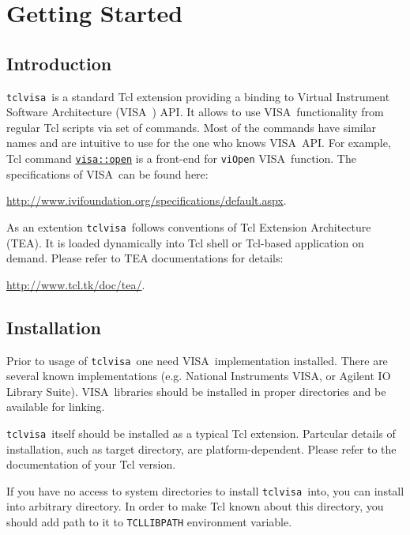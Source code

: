 \documentclass[12pt, a4paper]{report}
\newcommand{\tclvisa}{{\tt tclvisa }}
\newcommand{\VISA}{\mbox{VISA }}
\newcommand{\COMMANDREF}[1]{{\tt \hyperref[#1]{#1}}}
\newcommand{\VISACOMMANDREF}[1]{{\tt \mbox{#1}}\index{#1}}
\begin{document}
\maketitle

\tableofcontents

\chapter{Getting Started}

\section{Introduction}

\tclvisa is a standard Tcl extension providing a binding to Virtual Instrument Software Architecture (\VISA) API. It allows to use \VISA functionality from regular Tcl scripts via set of commands. Most of the commands have similar names and are intuitive to use for the one who knows \VISA API. For example, Tcl command \COMMANDREF{visa::open} is a front-end for \VISACOMMANDREF{viOpen} \VISA function. The specifications of \VISA can be found here: 

\href{http://www.ivifoundation.org/specifications/default.aspx}{http://www.ivifoundation.org/specifications/default.aspx}.

As an extention \tclvisa follows conventions of Tcl Extension Architecture (TEA). It is loaded dynamically into Tcl shell or Tcl-based application on demand. Please refer to TEA documentations for details: 

\href{http://www.tcl.tk/doc/tea/}{http://www.tcl.tk/doc/tea/}.

\section{Installation}

Prior to usage of \tclvisa one need \VISA implementation installed. There are several known implementations (e.g. National Instruments VISA, or Agilent IO Library Suite). \VISA libraries should be installed in proper directories and be available for linking.

\tclvisa itself should be installed as a typical Tcl extension. Partcular details of installation, such as target directory, are platform-dependent. Please refer to the documentation of your Tcl version.

If you have no access to system directories to install \tclvisa into, you can install into arbitrary directory. In order to make Tcl known about this directory, you should add path to it to \mbox{\tt TCLLIBPATH} environment variable.
\end{document}
